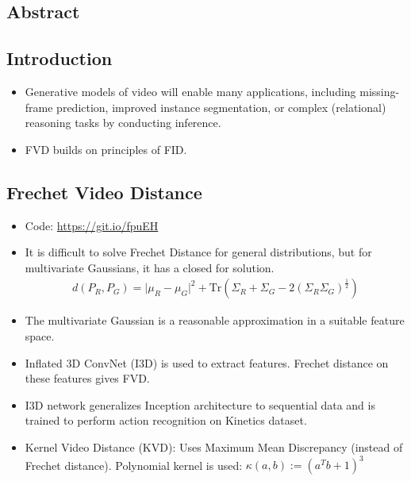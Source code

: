 \documentclass{article}
\begin{document}
    \subsection*{Abstract}

    \subsection{Introduction}\label{subsec:FVD_A_new_Metric_for_Video_Generation:introduction}
    \begin{itemize}
        \item Generative models of video will enable many applications, including missing-frame prediction, improved instance segmentation, or complex (relational) reasoning tasks by conducting inference.
        \item FVD builds on principles of FID\@.
    \end{itemize}

    \subsection{Frechet Video Distance}\label{subsec:FVD_A_new_Metric_for_Video_Generation:frechet-video-distance}
    \begin{itemize}
        \item Code: \url{https://git.io/fpuEH}
        \item It is difficult to solve Frechet Distance for general distributions, but for multivariate Gaussians, it has a closed for solution.
        \begin{align*}
            d(P_R, P_G) = \vert \mu_R - \mu_G \vert ^2 + \textrm{Tr} \left( \Sigma_R + \Sigma_G - 2(\Sigma_R \Sigma_G)^\frac{1}{2} \right)
        \end{align*}
        \item The multivariate Gaussian is a reasonable approximation in a suitable feature space.
        \item Inflated 3D ConvNet (I3D) is used to extract features.
        Frechet distance on these features gives FVD\@.
        \item I3D network generalizes Inception architecture to sequential data and is trained to perform action recognition on Kinetics dataset.
        \item Kernel Video Distance (KVD): Uses Maximum Mean Discrepancy (instead of Frechet distance).
        Polynomial kernel is used: $\kappa(a,b) := \left(a^T b+1\right)^3$
    \end{itemize}
\end{document}
